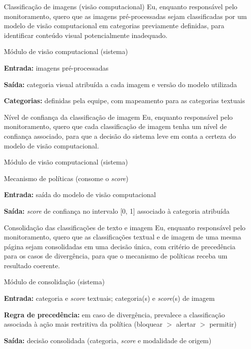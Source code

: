 \documentclass[
    12pt,           %
    oneside,        %
    a4paper,        %
    chapter=TITLE,  %
    english,        %
    brazil          %
]{abntex2}
\begin{document}
{Classificação de imagens (visão computacional)}
{Eu, enquanto responsável pelo monitoramento, quero que as imagens pré-processadas sejam classificadas por um modelo de visão computacional em categorias previamente definidas, para identificar conteúdo visual potencialmente inadequado.}
{\begin{dadoslista}
\item Módulo de visão computacional (sistema)
\end{dadoslista}}
{\begin{dadoslista}
\item \textbf{Entrada:} imagens pré-processadas
\item \textbf{Saída:} categoria visual atribuída a cada imagem e versão do modelo utilizada
\item \textbf{Categorias:} definidas pela equipe, com mapeamento para as categorias textuais
\end{dadoslista}}

{Nível de confiança da classificação de imagem}
{Eu, enquanto responsável pelo monitoramento, quero que cada classificação de imagem tenha um nível de confiança associado, para que a decisão do sistema leve em conta a certeza do modelo de visão computacional.}
{\begin{dadoslista}
\item Módulo de visão computacional (sistema)
\item Mecanismo de políticas (consome o \textit{score})
\end{dadoslista}}
{\begin{dadoslista}
\item \textbf{Entrada:} saída do modelo de visão computacional
\item \textbf{Saída:} \textit{score} de confiança no intervalo [0, 1] associado à categoria atribuída
\end{dadoslista}}

{Consolidação das classificações de texto e imagem}
{Eu, enquanto responsável pelo monitoramento, quero que as classificações textual e de imagem de uma mesma página sejam consolidadas em uma decisão única, com critério de precedência para os casos de divergência, para que o mecanismo de políticas receba um resultado coerente.}
{\begin{dadoslista}
\item Módulo de consolidação (sistema)
\end{dadoslista}}
{\begin{dadoslista}
\item \textbf{Entrada:} categoria e \textit{score} textuais; categoria(s) e \textit{score}(s) de imagem
\item \textbf{Regra de precedência:} em caso de divergência, prevalece a classificação associada à ação mais restritiva da política (bloquear $>$ alertar $>$ permitir)
\item \textbf{Saída:} decisão consolidada (categoria, \textit{score} e modalidade de origem)
\end{dadoslista}}
\end{document}
